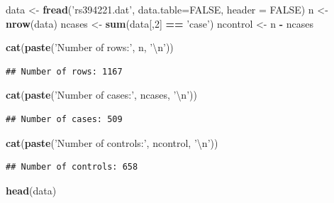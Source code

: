 \documentclass[
]{article}
\newenvironment{Shaded}{\begin{snugshade}}{\end{snugshade}}
\newcommand{\CharTok}[1]{\textcolor[rgb]{0.31,0.60,0.02}{#1}}
\newcommand{\DataTypeTok}[1]{\textcolor[rgb]{0.13,0.29,0.53}{#1}}
\newcommand{\DecValTok}[1]{\textcolor[rgb]{0.00,0.00,0.81}{#1}}
\newcommand{\KeywordTok}[1]{\textcolor[rgb]{0.13,0.29,0.53}{\textbf{#1}}}
\newcommand{\NormalTok}[1]{#1}
\newcommand{\OperatorTok}[1]{\textcolor[rgb]{0.81,0.36,0.00}{\textbf{#1}}}
\newcommand{\OtherTok}[1]{\textcolor[rgb]{0.56,0.35,0.01}{#1}}
\newcommand{\StringTok}[1]{\textcolor[rgb]{0.31,0.60,0.02}{#1}}
\begin{document}
\begin{Shaded}
\begin{Highlighting}[]
\NormalTok{data <-}\StringTok{ }\KeywordTok{fread}\NormalTok{(}\StringTok{'rs394221.dat'}\NormalTok{, }\DataTypeTok{data.table=}\OtherTok{FALSE}\NormalTok{, }\DataTypeTok{header =} \OtherTok{FALSE}\NormalTok{)}
\NormalTok{n <-}\StringTok{ }\KeywordTok{nrow}\NormalTok{(data)}
\NormalTok{ncases <-}\StringTok{ }\KeywordTok{sum}\NormalTok{(data[,}\DecValTok{2}\NormalTok{] }\OperatorTok{==}\StringTok{ 'case'}\NormalTok{)}
\NormalTok{ncontrol <-}\StringTok{ }\NormalTok{n }\OperatorTok{-}\StringTok{ }\NormalTok{ncases}

\KeywordTok{cat}\NormalTok{(}\KeywordTok{paste}\NormalTok{(}\StringTok{'Number of rows:'}\NormalTok{, n, }\StringTok{'}\CharTok{\textbackslash{}n}\StringTok{'}\NormalTok{))}
\end{Highlighting}
\end{Shaded}

\begin{verbatim}
## Number of rows: 1167
\end{verbatim}

\begin{Shaded}
\begin{Highlighting}[]
\KeywordTok{cat}\NormalTok{(}\KeywordTok{paste}\NormalTok{(}\StringTok{'Number of cases:'}\NormalTok{, ncases, }\StringTok{'}\CharTok{\textbackslash{}n}\StringTok{'}\NormalTok{))}
\end{Highlighting}
\end{Shaded}

\begin{verbatim}
## Number of cases: 509
\end{verbatim}

\begin{Shaded}
\begin{Highlighting}[]
\KeywordTok{cat}\NormalTok{(}\KeywordTok{paste}\NormalTok{(}\StringTok{'Number of controls:'}\NormalTok{, ncontrol, }\StringTok{'}\CharTok{\textbackslash{}n}\StringTok{'}\NormalTok{))}
\end{Highlighting}
\end{Shaded}

\begin{verbatim}
## Number of controls: 658
\end{verbatim}

\begin{Shaded}
\begin{Highlighting}[]
\KeywordTok{head}\NormalTok{(data)}
\end{Highlighting}
\end{Shaded}
\end{document}
